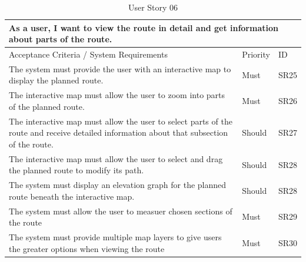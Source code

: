 \begin{table}[!htb]
\caption{User Story 06}
\label{tab:user-story-06}
\begin{tabular}{ p{8cm} p{1cm}  p{1cm} }
\hline
\multicolumn{3}{p{13cm}}{As a user, I want to view the route in detail and get information about parts of the route.}\\ 
\hline
Acceptance Criteria / System Requirements & Priority & ID\\
\hline
The system must provide the user with an interactive map to display the planned route. & Must & SR25 \\
The interactive map must allow the user to zoom into parts of the planned route. & Must & SR26\\
The interactive map must allow the user to select parts of the route and receive detailed information about that subsection of the route. & Should & SR27\\
The interactive map must allow the user to select and drag the planned route to modify its path. & Should & SR28\\ 
The system must display an elevation graph for the planned route beneath the interactive map. & Should & SR28\\
The system must allow the user to measuer chosen sections of the route & Must & SR29\\
The system must provide multiple map layers to give users the greater options when viewing the route & Must & SR30\\ 
\hline
\end{tabular}
\end{table}

